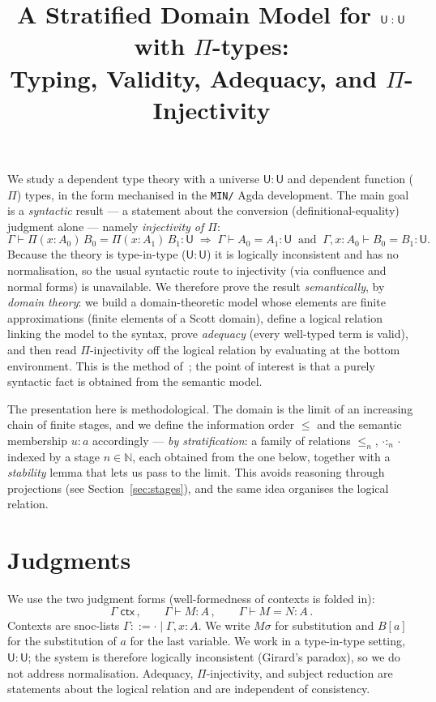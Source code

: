 \documentclass[11pt]{article}
\title{A Stratified Domain Model for $\U:\U$ with $\Pi$-types:\\
       Typing, Validity, Adequacy, and $\Pi$-Injectivity}
\author{}
\date{}
\newcommand{\wf}[1]{#1\;\mathsf{ctx}}
\newcommand{\hastype}[3]{#1 \vdash #2 : #3}
\newcommand{\conveq}[4]{#1 \vdash #2 = #3 : #4}
\newcommand{\Pitype}[2]{\Pi(#1)\,#2}
\newcommand{\substone}[2]{#1[#2]}
\newcommand{\U}{\mathsf{U}}
\newcommand{\Nat}{\mathbb{N}}
\newcommand{\lest}[1]{\mathrel{\leq_{#1}}}      %
\newcommand{\memst}[3]{#1 \mathrel{:_{#2}} #3}   %
\theoremstyle{plain}
\theoremstyle{definition}
\begin{document}
\maketitle

We study a dependent type theory with a universe $\U:\U$ and dependent
function ($\Pi$) types, in the form mechanised in the \texttt{MIN/} Agda
development.  The main goal is a \emph{syntactic} result --- a statement about
the conversion (definitional-equality) judgment alone --- namely
\emph{injectivity of $\Pi$}:
\[
  \conveq{\Gamma}{\Pitype{x{:}A_0}{B_0}}{\Pitype{x{:}A_1}{B_1}}{\U}
  \;\Longrightarrow\;
  \conveq{\Gamma}{A_0}{A_1}{\U}
  \ \text{ and }\
  \conveq{\Gamma, x{:}A_0}{B_0}{B_1}{\U}.
\]
Because the theory is type-in-type ($\U:\U$) it is logically inconsistent and
has no normalisation, so the usual syntactic route to injectivity (via
confluence and normal forms) is unavailable.  We therefore prove the result
\emph{semantically}, by \emph{domain theory}: we build a domain-theoretic
model whose elements are finite approximations (finite elements of a Scott
domain), define a logical relation linking the model to the syntax, prove
\emph{adequacy} (every well-typed term is valid), and then read $\Pi$-injectivity
off the logical relation by evaluating at the bottom environment.  This is the
method of~\cite{CH2018}; the point of interest is that a purely syntactic
fact is obtained from the semantic model.

The presentation here is methodological.  The domain is the limit of an
increasing chain of finite stages, and we define the information order $\leq$
and the semantic membership $u : a$ accordingly --- \emph{by stratification}:
a family of relations $\lest{n}$, $\memst{\cdot}{n}{\cdot}$ indexed by a stage
$n\in\Nat$, each obtained from the one below, together with a \emph{stability}
lemma that lets us pass to the limit.  This avoids reasoning through
projections (see Section~\ref{sec:stages}), and the same idea organises the
logical relation.

\section{Judgments}

We use the two judgment forms (well-formedness of contexts is folded in):
\[
  \wf{\Gamma}\,, \qquad
  \hastype{\Gamma}{M}{A}\,, \qquad
  \conveq{\Gamma}{M}{N}{A}\,.
\]
Contexts are snoc-lists $\Gamma ::= \cdot \mid \Gamma, x{:}A$.  We write
$M\sigma$ for substitution and $\substone{B}{a}$ for the substitution of $a$
for the last variable.  We work in a type-in-type setting, $\U:\U$; the system
is therefore logically inconsistent (Girard's paradox), so we do not address
normalisation.  Adequacy, $\Pi$-injectivity, and subject reduction are
statements about the logical relation and are independent of consistency.
\end{document}
